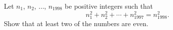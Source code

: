Let $n_1$, $n_2$, $\ldots$, $n_{1998}$ be positive integers such that \[ n_1^2 + n_2^2 + \cdots + n_{1997}^2 = n_{1998}^2. \] Show that at least two of the numbers are even.